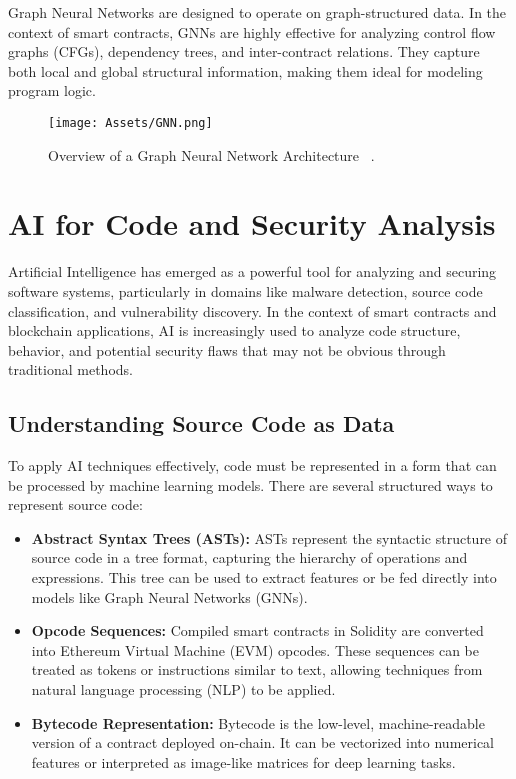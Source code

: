 Graph Neural Networks are designed to operate on graph-structured data. In the context of smart contracts, GNNs are highly effective for analyzing control flow graphs (CFGs), dependency trees, and inter-contract relations. They capture both local and global structural information, making them ideal for modeling program logic.

\begin{figure}[H]
    \centering
    \texttt{[image: Assets/GNN.png]}
    \caption{Overview of a Graph Neural Network Architecture ~\cite{neptune2023gnn}.}
    \label{fig:gnn}
\end{figure}


\section{AI for Code and Security Analysis}
Artificial Intelligence has emerged as a powerful tool for analyzing and securing software systems, particularly in domains like malware detection, source code classification, and vulnerability discovery. In the context of smart contracts and blockchain applications, AI is increasingly used to analyze code structure, behavior, and potential security flaws that may not be obvious through traditional methods.

\subsection{Understanding Source Code as Data}

To apply AI techniques effectively, code must be represented in a form that can be processed by machine learning models. There are several structured ways to represent source code:

\begin{itemize}
    \item \textbf{Abstract Syntax Trees (ASTs):} ASTs represent the syntactic structure of source code in a tree format, capturing the hierarchy of operations and expressions. This tree can be used to extract features or be fed directly into models like Graph Neural Networks (GNNs).
    
    \item \textbf{Opcode Sequences:} Compiled smart contracts in Solidity are converted into Ethereum Virtual Machine (EVM) opcodes. These sequences can be treated as tokens or instructions similar to text, allowing techniques from natural language processing (NLP) to be applied.
    
    \item \textbf{Bytecode Representation:} Bytecode is the low-level, machine-readable version of a contract deployed on-chain. It can be vectorized into numerical features or interpreted as image-like matrices for deep learning tasks.
\end{itemize}

